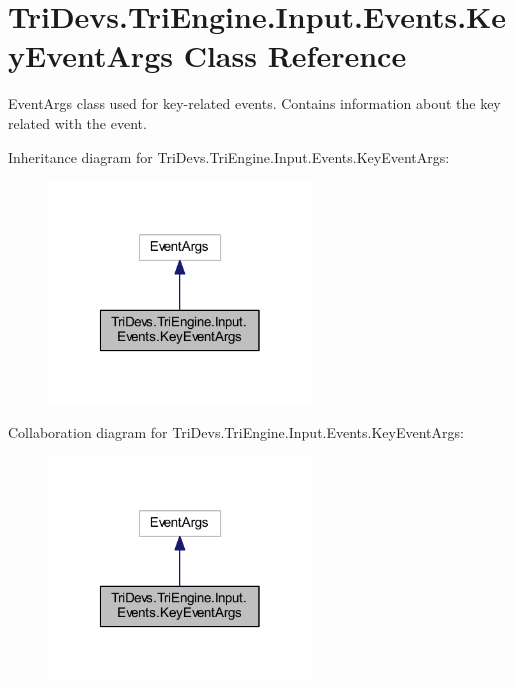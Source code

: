 \hypertarget{class_tri_devs_1_1_tri_engine_1_1_input_1_1_events_1_1_key_event_args}{\section{Tri\-Devs.\-Tri\-Engine.\-Input.\-Events.\-Key\-Event\-Args Class Reference}
\label{class_tri_devs_1_1_tri_engine_1_1_input_1_1_events_1_1_key_event_args}
}


Event\-Args class used for key-\/related events. Contains information about the key related with the event.  




Inheritance diagram for Tri\-Devs.\-Tri\-Engine.\-Input.\-Events.\-Key\-Event\-Args\-:
\nopagebreak
\begin{figure}[H]
\begin{center}
\leavevmode
\includegraphics[width=198pt]{class_tri_devs_1_1_tri_engine_1_1_input_1_1_events_1_1_key_event_args__inherit__graph}
\end{center}
\end{figure}


Collaboration diagram for Tri\-Devs.\-Tri\-Engine.\-Input.\-Events.\-Key\-Event\-Args\-:
\nopagebreak
\begin{figure}[H]
\begin{center}
\leavevmode
\includegraphics[width=198pt]{class_tri_devs_1_1_tri_engine_1_1_input_1_1_events_1_1_key_event_args__coll__graph}
\end{center}
\end{figure}
